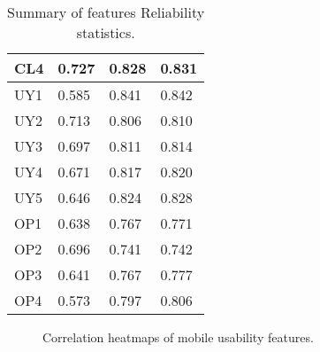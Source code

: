 \documentclass[preprint,12pt]{elsarticle}
\begin{document}
\begin{table}[]
\begin{tabular}{|l|l|l|l|}
CL4 & 0.727                 & 0.828        & 0.831        \\ \hline
UY1 & 0.585                 & 0.841        & 0.842        \\ \hline
UY2 & 0.713                 & 0.806        & 0.810        \\ \hline
UY3 & 0.697                 & 0.811        & 0.814        \\ \hline
UY4 & 0.671                 & 0.817        & 0.820        \\ \hline
UY5 & 0.646                 & 0.824        & 0.828        \\ \hline
OP1 & 0.638                 & 0.767        & 0.771        \\ \hline
OP2 & 0.696                 & 0.741        & 0.742        \\ \hline
OP3 & 0.641                 & 0.767        & 0.777        \\ \hline
OP4 & 0.573                 & 0.797        & 0.806        \\ \hline
\end{tabular}
\caption{\label{tab:reliability-all-items}Summary of features Reliability statistics.}
\end{table}

\begin{figure}[htbp]
    \centering
    \small
    \hfill
    \hfill
    \hfill
    \caption{Correlation heatmaps of mobile usability features.}
    \label{fig:heatmaps}
\end{figure}
\end{document}
